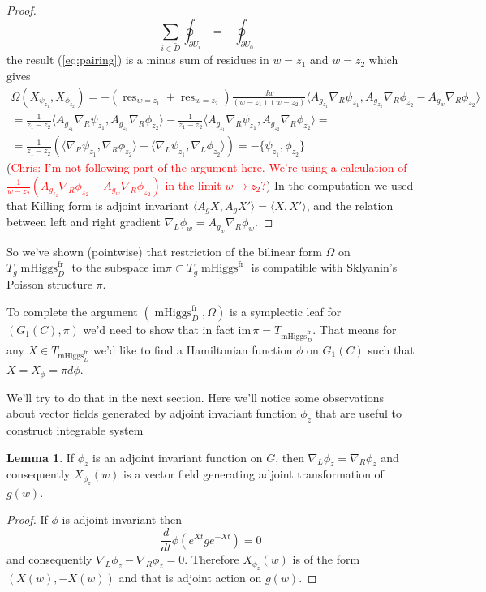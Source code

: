 \documentclass[11pt, oneside, reqno]{amsart}
\theoremstyle{definition} \newtheorem{definition}{Definition}[section]
\newtheorem{lemma}[definition]{Lemma}
\theoremstyle{definition} \newtheorem{remark}[definition]{Remark}
\theoremstyle{definition} \newtheorem{remarks}[definition]{Remarks}
\theoremstyle{definition} \newtheorem{question}[definition]{Question}
\theoremstyle{definition} \newtheorem*{note}{Note}
\theoremstyle{definition} \newtheorem{example}[definition]{Example}
\theoremstyle{definition} \newtheorem{examples}[definition]{Examples}
\DeclareMathOperator{\res}{res}
\DeclareMathOperator{\mhiggs}{mHiggs}
\newcommand{\fr}{\mathrm{fr}}
\newcommand{\chris}[1]{(\textcolor{red}{Chris: #1})}
\begin{document}
\begin{proof}
\begin{equation}
\label{eq:residue}
  \sum_{i \in \tilde D} \oint_{\partial U_i }  = - \oint_{\partial U_0} 
\end{equation}
the result (\ref{eq:pairing}) is a minus sum of residues in $w = z_1$ and $w = z_2$
which gives
  \begin{multline}
   \Omega(X_{\psi_{z_1}}, X_{\phi_{z_2}}) = - (\res_{w = z_1}  + \res_{w = z_2}) \frac{dw }{(w - z_1)(w - z_2)} \langle A_{g_{z_1}} \nabla_{R} \psi_{z_1},
   A_{g_{z_2}} \nabla_{R} \phi_{z_2}  - A_{g_w} \nabla_{R} \phi_{z_2} \rangle \\
   =   \frac{1}{z_1 - z_2}  \langle A_{g_{z_1}} \nabla_{R} \psi_{z_1} , A_{g_{z_1}} \nabla_{R} \phi_{z_2}\rangle   - \frac{1}{z_1 - z_2}  \langle A_{g_{z_1}} \nabla_{R} \psi_{z_1} , A_{g_{z_2}} \nabla_{R} \phi_{z_2} \rangle =\\
   = \frac{1}{z_1 - z_2} (\langle \nabla_{R} \psi_{z_1} , \nabla_{R} \phi_{z_2}\rangle - 
   \langle  \nabla_{L} \psi_{z_1} , \nabla_{L} \phi_{z_2} \rangle ) =
   - \{\psi_{z_1}, \phi_{z_2} \} 
  \end{multline}
  \chris{I'm not following part of the argument here.  We're using a calculation of $\frac 1{w-z_2}(A_{g_{z_2}} \nabla_{R} \phi_{z_2}  - A_{g_w} \nabla_{R} \phi_{z_2})$ in the limit $w\to z_2$?}
In the computation we used that Killing form is adjoint invariant
$\langle A_{g} X, A_{g} X' \rangle = \langle X, X' \rangle $,
and the relation between left and right gradient $\nabla_{L} \phi_{w} = A_{g_w} \nabla_{R} \phi_w$.
\end{proof}

So we've shown (pointwise) that restriction of the bilinear form $\Omega$ on $T_g\mhiggs^{\fr}_{D}$
  to the subspace $\mathrm{im} \pi \subset T_g\mhiggs^{\fr}$ is compatible with
Sklyanin's Poisson structure $\pi$.

To complete the argument  $(\mhiggs^{\fr}_{D}, \Omega)$ is
a symplectic leaf for $(G_1(C), \pi)$ we'd need to show that in fact
$\mathrm{im} \, \pi = T_{\mhiggs^{\fr}_{D}}$.
That means for any $X \in T_{\mhiggs^{\fr}_{D}} $ we'd like to find a Hamiltonian
function $\phi$ on $G_1(C)$ such that $X = X_{\phi} = \pi d \phi$.

We'll try to do that in the next section. Here we'll notice some observations
about vector fields generated by adjoint invariant function $\phi_z$ that are useful
to construct integrable system 
\begin{lemma}
 If $\phi_z$ is an adjoint invariant function on $G$, then
$\nabla_{L} \phi_z  = \nabla_{R} \phi_z$ and consequently $X_{\phi_z}(w)$ is
a vector field generating adjoint transformation of $g(w)$. 
\end{lemma}
\begin{proof}
  If $\phi$ is adjoint invariant then
  \begin{equation}
    \frac{d}{dt} \phi(e^{Xt} g e^{-Xt}) = 0
  \end{equation}
  and consequently $\nabla_{L} \phi_z - \nabla_{R} \phi_z  = 0$. Therefore $X_{\phi_z}(w)$ is
  of the form $(X(w), -X(w))$ and that is adjoint action on $g(w)$. 
\end{proof}
\end{document}
